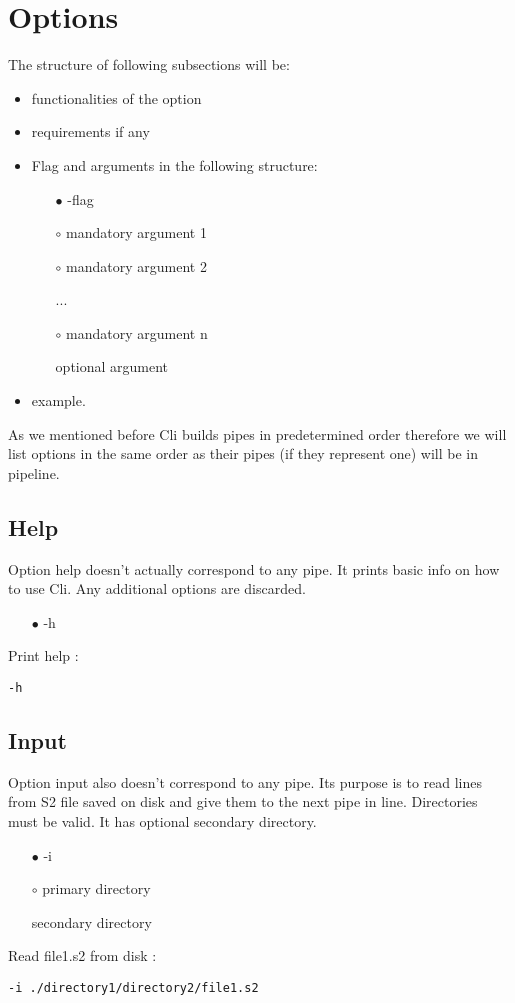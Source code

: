 \documentclass[english]{article}
\begin{document}
\section{Options}
The structure of following subsections will be:
\begin{itemize}
\item functionalities of the option
\item requirements if any
\item{
Flag and arguments in the following structure:
 \begin{itemize}
 \item[$\bullet$] -flag
 \item[$\circ$] mandatory argument 1
 \item[$\circ$] mandatory argument 2
 
 ...
  \item[$\circ$] mandatory argument n
  \item[\textasteriskcentered] optional argument
 \end{itemize}
 }
\item example.
\end{itemize}

As we mentioned before Cli builds pipes in predetermined order therefore we will list options in the same order as their pipes (if they represent one) will be in pipeline.

\subsection{Help}
Option help doesn't actually correspond to any pipe. It prints basic info on how to use Cli. Any additional options are discarded.
\begin{itemize}
\item[$\bullet$] -h
\end{itemize}
Print help : \begin{lstlisting} 
-h
\end{lstlisting}


\subsection{Input}
Option input also doesn't correspond to any pipe. Its purpose is to read lines from S2 file saved on disk and give them to the next pipe in line. Directories must be valid. It has optional secondary directory.
\begin{itemize}
\item[$\bullet$] -i
\item[$\circ$] primary directory
\item[\textasteriskcentered] secondary directory
\end{itemize}
Read file1.s2 from disk : \begin{lstlisting} 
-i ./directory1/directory2/file1.s2
\end{lstlisting}
\end{document}
